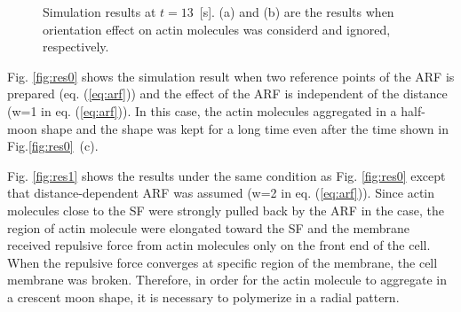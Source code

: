 \documentclass[a4paper,12pt, oneside]{book}
\begin{document}
\begin{figure}[tbp]
 \caption{Simulation results at $t=13$~[s]. (a) and (b) are the results when orientation effect on actin molecules was considerd and ignored, respectively.}
 \label{fig:res5}
\end{figure}
Fig. \ref{fig:res0} shows the simulation result when two reference points of the ARF is prepared (eq. (\ref{eq:arf})) and the effect of the ARF is independent of the distance (w=1 in eq. (\ref{eq:arf})).
In this case, the actin molecules aggregated in a half-moon shape and the shape was kept for a long time even after the time shown in Fig.\ref{fig:res0}~(c).

Fig. \ref{fig:res1} shows the results under the same condition as Fig. \ref{fig:res0} except that distance-dependent ARF was assumed (w=2 in eq. (\ref{eq:arf})).
Since actin molecules close to the SF were strongly pulled back by the ARF in the case, the region of actin molecule were elongated toward the SF and the membrane received repulsive force from actin molecules only on the front end of the cell.
When the repulsive force converges at specific region of the membrane, the cell membrane was broken.
Therefore, in order for the actin molecule to aggregate in a crescent moon shape, it is necessary to polymerize in a radial pattern.
\end{document}
